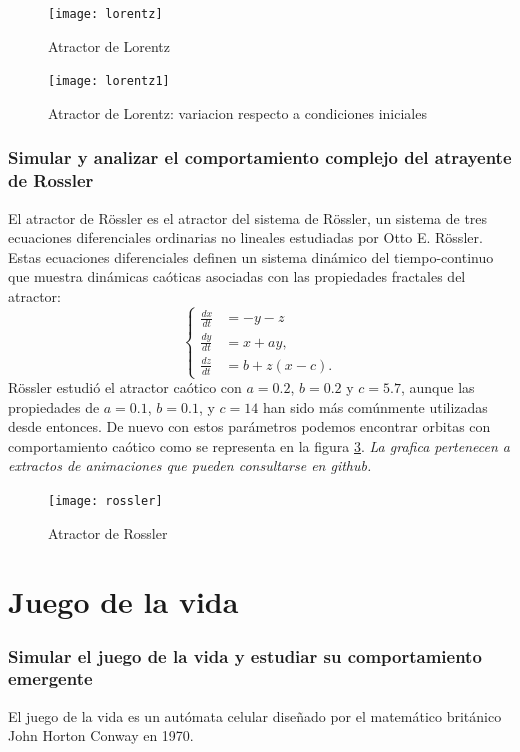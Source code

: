  \begin{figure}
 	\centering
 	\texttt{[image: lorentz]}
 	\caption{Atractor de Lorentz}
 	\label{lorentz1}
 \end{figure}
 \begin{figure}
 	\centering
 	\texttt{[image: lorentz1]}
 	\caption{Atractor de Lorentz: variacion respecto a condiciones iniciales}
 	\label{lorentz2}
 \end{figure}
 
 \subsubsection{\large Simular y analizar el comportamiento complejo del atrayente de Rossler} 
 
 El atractor de Rössler es el atractor del sistema de Rössler, un sistema de tres ecuaciones diferenciales ordinarias no lineales estudiadas por Otto E. Rössler. Estas ecuaciones diferenciales definen un sistema dinámico del tiempo-continuo que muestra dinámicas caóticas asociadas con las propiedades fractales del atractor:
 $$\left\{\begin{matrix}\frac{dx}{dt} &= -y - z \\
 \frac{dy}{dt} &= x + ay, \\
 \frac{dz}{dt} &= b + z(x-c).\end{matrix}\right.$$
 Rössler estudió el atractor caótico con $ a = 0.2 $, $ b = 0.2 $ y $ c = 5.7 $, aunque las propiedades de $ a = 0.1 $, $ b = 0.1 $, y $ c = 14 $ han sido más comúnmente utilizadas desde entonces.
 De nuevo con estos parámetros podemos encontrar orbitas con comportamiento caótico como se representa en la figura \ref{rossler1}. \textit{ La grafica pertenecen a extractos de animaciones que pueden consultarse en github.}
  \begin{figure}
  	\centering
  	\texttt{[image: rossler]}
  	\caption{Atractor de Rossler}
  	\label{rossler1}
  \end{figure}
  
 \section{Juego de la vida}
 \subsubsection{\large Simular el juego de la vida y estudiar su comportamiento emergente} 
  
  El juego de la vida es un autómata celular diseñado por el matemático británico John Horton Conway en 1970.
  
